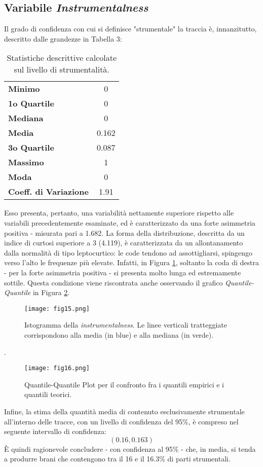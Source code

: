 \documentclass[fleqn,10pt]{SelfArx} %
\begin{document}
\subsection*{Variabile \textit{Instrumentalness}}
Il grado di confidenza con cui si definisce "strumentale" la traccia è, innanzitutto, descritto dalle grandezze in Tabella 3:
{\begin{table}[H]
\centering

\begin{tabular}[t]{lc}
\toprule
\midrule
\textbf{Minimo}&0\\
\textbf{1o Quartile}&0\\
\textbf{Mediana}&0\\
\textbf{Media}&0.162\\
\textbf{3o Quartile}&0.087\\
\textbf{Massimo}&1\\
\textbf{Moda}&0\\
\textbf{Coeff. di Variazione}&1.91\\
\bottomrule
\end{tabular}
\caption{Statistiche descrittive calcolate sul livello di strumentalità.}
\end{table}}
Esso presenta, pertanto, una variabilità nettamente superiore rispetto alle variabili precedentemente esaminate, ed è caratterizzato da una forte asimmetria positiva - misurata pari a 1.682. La forma della distribuzione, descritta da un indice di curtosi superiore a 3 (4.119), è caratterizzata da un allontanamento dalla normalità di tipo leptocurtico: le code tendono ad assottigliarsi, spingengo verso l'alto le frequenze più elevate. Infatti, in Figura \ref{fig:fig15}, soltanto la coda di destra - per la forte asimmetria positiva - si presenta molto lunga ed estremamente sottile. Questa condizione viene riscontrata anche osservando il grafico \textit{Quantile-Quantile} in Figura \ref{fig:fig16}.
\begin{figure}[H]
    \centering
    \texttt{[image: fig15.png]}
    \caption{Istogramma della \textit{instrumentalness}. Le linee verticali tratteggiate corrispondono alla media (in blue) e alla mediana (in verde).}
    \label{fig:fig15}
\end{figure}. 
\begin{figure}[H]
    \centering
    \texttt{[image: fig16.png]}
    \caption{Quantile-Quantile Plot per il confronto fra i quantili empirici e i quantili teorici.}
    \label{fig:fig16}
\end{figure}
Infine, la stima della quantità media di contenuto esclusivamente strumentale all'interno delle tracce, con un livello di confidenza del 95\%, è compreso nel seguente intervallo di confidenza:
\begin{equation}
    (0.16,0.163)
\end{equation}
È quindi ragionevole concludere - con confidenza al 95\% - che, in media, si tenda a produrre brani che contengono tra il 16 e il 16.3\% di parti strumentali.
\end{document}
